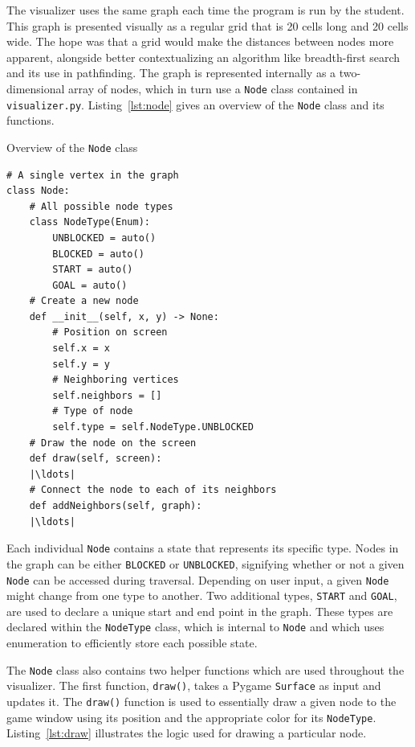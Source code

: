 \documentclass[pageno]{jpaper}
\begin{document}
The visualizer uses the same graph each time the program is run by the student. This graph is presented visually as a regular grid that is 20 cells long and 20 cells wide. The hope was that a grid would make the distances between nodes more apparent, alongside better contextualizing an algorithm like breadth-first search and its use in pathfinding. The graph is represented internally as a two-dimensional array of nodes, which in turn use a \texttt{Node} class contained in \texttt{visualizer.py}. Listing~\ref{lst:node} gives an overview of the \texttt{Node} class and its functions.

\begin{listing}[hbt]
\centering
\begin{minipage}{0.8\textwidth}%
\linespread{1.0}
\caption{Overview of the \texttt{Node} class}
\begin{verbatim}
# A single vertex in the graph
class Node:
	# All possible node types
	class NodeType(Enum):
		UNBLOCKED = auto()
		BLOCKED = auto()
		START = auto()
		GOAL = auto()
	# Create a new node
	def __init__(self, x, y) -> None:
		# Position on screen
		self.x = x
		self.y = y
		# Neighboring vertices
		self.neighbors = []
		# Type of node
		self.type = self.NodeType.UNBLOCKED
	# Draw the node on the screen
	def draw(self, screen):
	|\ldots|
	# Connect the node to each of its neighbors
	def addNeighbors(self, graph):
	|\ldots|
\end{verbatim}
\label{lst:node}
\end{minipage}
\end{listing}

Each individual \texttt{Node} contains a state that represents its specific type. Nodes in the graph can be either \texttt{BLOCKED} or \texttt{UNBLOCKED}, signifying whether or not a given \texttt{Node} can be accessed during traversal. Depending on user input, a given \texttt{Node} might change from one type to another. Two additional types, \texttt{START} and \texttt{GOAL}, are used to declare a unique start and end point in the graph. These types are declared within the \texttt{NodeType} class, which is internal to \texttt{Node} and which uses enumeration to efficiently store each possible state.

The \texttt{Node} class also contains two helper functions which are used throughout the visualizer. The first function, \texttt{draw()}, takes a Pygame \texttt{Surface} as input and updates it. The \texttt{draw()} function is used to essentially draw a given node to the game window using its position and the appropriate color for its \texttt{NodeType}. Listing~\ref{lst:draw} illustrates the logic used for drawing a particular node.
\end{document}
